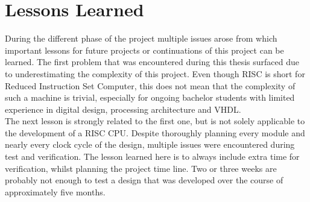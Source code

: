 \chapter{Lessons Learned}
During the different phase of the project multiple issues arose from which important lessons for future projects or continuations of this project can be learned. The first problem that was encountered during this thesis surfaced due to underestimating the complexity of this project. Even though \ac{RISC} is short for Reduced Instruction Set Computer, this does not mean that the complexity of such a machine is trivial, especially for ongoing bachelor students with limited experience in digital design, processing architecture and \ac{VHDL}.\\
The next lesson is strongly related to the first one, but is not solely applicable to the development of a \ac{RISC} \ac{CPU}. Despite thoroughly planning every module and nearly every clock cycle of the design, multiple issues were encountered during test and verification. The lesson learned here is to always include extra time for verification, whilst planning the project time line. Two or three weeks are probably not enough to test a design that was developed over the course of approximately five months. \\
 